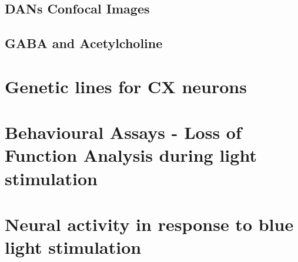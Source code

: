    \subsection{DANs Confocal Images}
    \subsection{GABA and Acetylcholine}


\section{Genetic lines for CX neurons}
\section{Behavioural Assays - Loss of Function Analysis during light stimulation}
\section{Neural activity in response to blue light stimulation}



